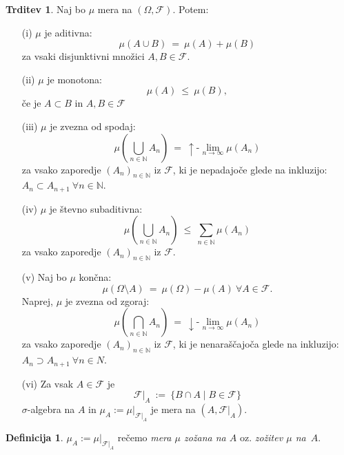 \documentclass[11pt]{article}
\newcommand{\N}{\mathbb{N}}
\newcommand{\F}{\mathcal{F}}
\newcommand{\set}[1]{\{#1\}}
\newcommand{\oklepaj}[1]{\left(#1\right)}
\newcommand{\1}{\mathbbm{1}}
\theoremstyle{definition}
\newtheorem{definicija}{Definicija}[section]
\theoremstyle{definition}
\newtheorem{trditev}{Trditev}[section]
\theoremstyle{definition}
\theoremstyle{definition}
\begin{document}
\begin{trditev}

Naj bo $\mu$ mera na $(\Omega, \F)$. Potem:
\begin{enumerate}

\item[(i)] $\mu$ je aditivna: 
$$\mu(A \cup B) ~=~ \mu(A) + \mu(B)$$
za vsaki disjunktivni množici $A,B \in \F$.

\item[(ii)] $\mu$ je monotona:
$$\mu(A) ~\leq~ \mu(B),$$
če je $A \subset B$ in $A,B \in \F$

\item[(iii)] $\mu$ je zvezna od spodaj:
$$\mu\oklepaj{\bigcup_{n \in \N} A_n} ~=~ {\uparrow\text{-}\lim_{n \rightarrow \infty}} \mu(A_n)$$
za vsako zaporedje $(A_n)_{n \in \N}$ iz $\F$, ki je nepadajoče glede na inkluzijo: $A_n \subset A_{n+1} ~\forall n \in \N$.

\item[(iv)] $\mu$ je števno subaditivna:
$$\mu\oklepaj{\bigcup_{n \in \N} A_n} ~\leq~ \sum_{n \in \N} \mu(A_n)$$
za vsako zaporedje $(A_n)_{n \in \N}$ iz $\F$.

\item[(v)] Naj bo $\mu$ končna:
$$\mu(\Omega \setminus A) ~=~ \mu(\Omega) - \mu(A) ~\forall A \in \F.$$
Naprej, $\mu$ je zvezna od zgoraj:
$$\mu\oklepaj{\bigcap_{n \in \N} A_n} ~=~ {\downarrow\text{-}\lim_{n \rightarrow \infty}}\mu(A_n)$$
za vsako zaporedje $(A_n)_{n \in \N}$ iz $\F$, ki je nenaraščajoča glede na inkluzijo: $A_n \supset A_{n+1} ~\forall n \in N$.

\item[(vi)] Za vsak $A \in \F$ je
$$\F \big|_A ~:=~ \set{B \cap A \mid B \in \F}$$
$\sigma$-algebra na $A$ in $\mu_A := \mu\big|_{\F\big|_A}$ je mera na $(A, \F\big|_A)$. 

\end{enumerate}

\end{trditev}
\vspace{0.5cm}

\begin{definicija}

$\mu_A := \mu\big|_{\F\big|_A}$ rečemo \textit{mera $\mu$ zožana na $A$} oz. \textit{zožitev $\mu$ \hbox{na $A$}}.

\end{definicija}
\vspace{0.5cm}

\end{document}
